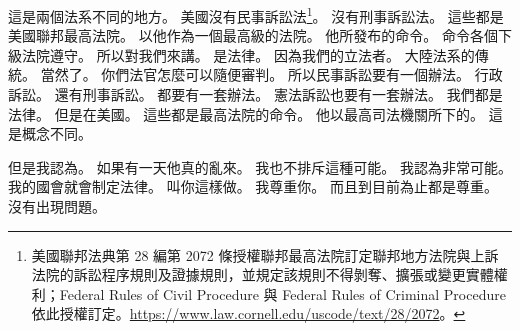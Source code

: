\hypertarget{w01:cue:2183}{}這是兩個法系不同的地方。
\hypertarget{w01:cue:2184}{}美國沒有民事訴訟法\footnote{美國聯邦法典第 28 編第 2072 條授權聯邦最高法院訂定聯邦地方法院與上訴法院的訴訟程序規則及證據規則，並規定該規則不得剝奪、擴張或變更實體權利；Federal Rules of Civil Procedure 與 Federal Rules of Criminal Procedure 依此授權訂定。\url{https://www.law.cornell.edu/uscode/text/28/2072}。}。
\hypertarget{w01:cue:2185}{}沒有刑事訴訟法。
\hypertarget{w01:cue:2186}{}這些都是美國聯邦最高法院。
\hypertarget{w01:cue:2187}{}以他作為一個最高級的法院。
\hypertarget{w01:cue:2188}{}他所發布的命令。
\hypertarget{w01:cue:2189}{}命令各個下級法院遵守。
\hypertarget{w01:cue:2190}{}所以對我們來講。
\hypertarget{w01:cue:2191}{}是法律。
\hypertarget{w01:cue:2192}{}因為我們的立法者。
\hypertarget{w01:cue:2193}{}大陸法系的傳統。
\hypertarget{w01:cue:2194}{}當然了。
\hypertarget{w01:cue:2195}{}你們法官怎麼可以隨便審判。
\hypertarget{w01:cue:2196}{}所以民事訴訟要有一個辦法。
\hypertarget{w01:cue:2197}{}行政訴訟。
\hypertarget{w01:cue:2198}{}還有刑事訴訟。
\hypertarget{w01:cue:2199}{}都要有一套辦法。
\hypertarget{w01:cue:2200}{}憲法訴訟也要有一套辦法。
\hypertarget{w01:cue:2201}{}我們都是法律。
\hypertarget{w01:cue:2202}{}但是在美國。
\hypertarget{w01:cue:2203}{}這些都是最高法院的命令。
\hypertarget{w01:cue:2204}{}他以最高司法機關所下的。
\hypertarget{w01:cue:2205}{}這是概念不同。

\hypertarget{w01:cue:2206}{}但是我認為。
\hypertarget{w01:cue:2207}{}如果有一天他真的亂來。
\hypertarget{w01:cue:2208}{}我也不排斥這種可能。
\hypertarget{w01:cue:2209}{}我認為非常可能。
\hypertarget{w01:cue:2210}{}我的國會就會制定法律。
\hypertarget{w01:cue:2211}{}叫你這樣做。
\hypertarget{w01:cue:2212}{}我尊重你。
\hypertarget{w01:cue:2213}{}而且到目前為止都是尊重。
\hypertarget{w01:cue:2214}{}沒有出現問題。

